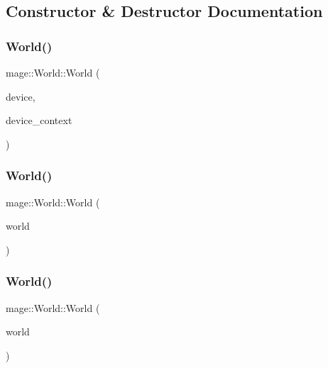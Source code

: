 \subsection{Constructor \& Destructor Documentation}
\hypertarget{classmage_1_1_world_a296260d883f789b80ab22d2433dfb5a2}{}\label{classmage_1_1_world_a296260d883f789b80ab22d2433dfb5a2} 
\subsubsection{\texorpdfstring{World()}{World()}\hspace{0.1cm}{\footnotesize\ttfamily [1/3]}}
{\footnotesize\ttfamily mage\+::\+World\+::\+World (\begin{DoxyParamCaption}\item[{I\+D3\+D11\+Device2 $\ast$}]{device,  }\item[{I\+D3\+D11\+Device\+Context2 $\ast$}]{device\+\_\+context }\end{DoxyParamCaption})}

\hypertarget{classmage_1_1_world_a28e20e33499cd57282cefa5ab0fda041}{}\label{classmage_1_1_world_a28e20e33499cd57282cefa5ab0fda041} 
\subsubsection{\texorpdfstring{World()}{World()}\hspace{0.1cm}{\footnotesize\ttfamily [2/3]}}
{\footnotesize\ttfamily mage\+::\+World\+::\+World (\begin{DoxyParamCaption}\item[{const \hyperlink{classmage_1_1_world}{World} \&}]{world }\end{DoxyParamCaption})\hspace{0.3cm}{\ttfamily [delete]}}

\hypertarget{classmage_1_1_world_a6170766c5b83465cfdbf847e67315d91}{}\label{classmage_1_1_world_a6170766c5b83465cfdbf847e67315d91} 
\subsubsection{\texorpdfstring{World()}{World()}\hspace{0.1cm}{\footnotesize\ttfamily [3/3]}}
{\footnotesize\ttfamily mage\+::\+World\+::\+World (\begin{DoxyParamCaption}\item[{\hyperlink{classmage_1_1_world}{World} \&\&}]{world }\end{DoxyParamCaption})\hspace{0.3cm}{\ttfamily [default]}}


